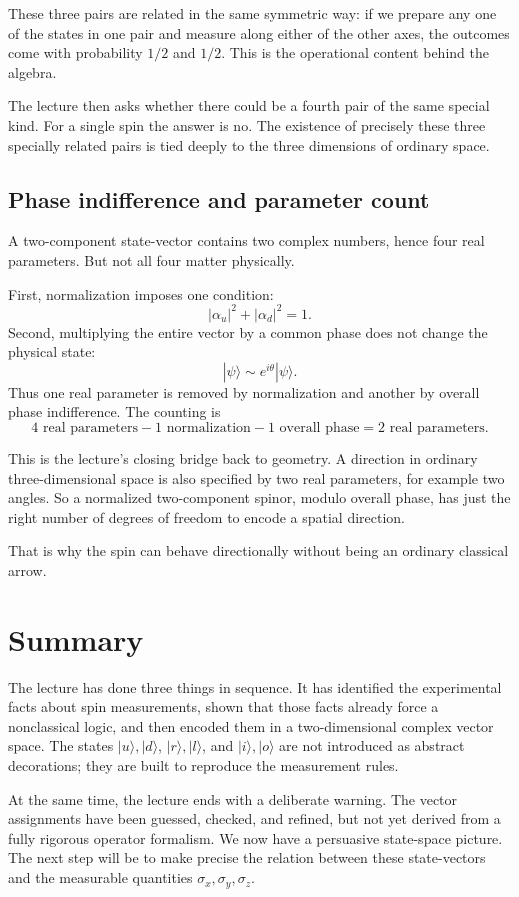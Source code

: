 These three pairs are related in the same symmetric way: if we prepare any one of the states in one pair and measure along either of the other axes, the outcomes come with probability \(1/2\) and \(1/2\). This is the operational content behind the algebra.

The lecture then asks whether there could be a fourth pair of the same special kind. For a single spin the answer is no. The existence of precisely these three specially related pairs is tied deeply to the three dimensions of ordinary space.

\subsection{Phase indifference and parameter count}

A two-component state-vector contains two complex numbers, hence four real parameters. But not all four matter physically.

First, normalization imposes one condition:
\begin{equation}
|\alpha_u|^2+|\alpha_d|^2=1.
\end{equation}
Second, multiplying the entire vector by a common phase does not change the physical state:
\begin{equation}
|\psi\rangle \sim e^{i\theta}|\psi\rangle.
\end{equation}
Thus one real parameter is removed by normalization and another by overall phase indifference. The counting is
\begin{equation}
4\text{ real parameters}-1\text{ normalization}-1\text{ overall phase}=2\text{ real parameters}.
\end{equation}

This is the lecture's closing bridge back to geometry. A direction in ordinary three-dimensional space is also specified by two real parameters, for example two angles. So a normalized two-component spinor, modulo overall phase, has just the right number of degrees of freedom to encode a spatial direction.

That is why the spin can behave directionally without being an ordinary classical arrow.

\section{Summary}

The lecture has done three things in sequence. It has identified the experimental facts about spin measurements, shown that those facts already force a nonclassical logic, and then encoded them in a two-dimensional complex vector space. The states \(|u\rangle,|d\rangle\), \(|r\rangle,|l\rangle\), and \(|i\rangle,|o\rangle\) are not introduced as abstract decorations; they are built to reproduce the measurement rules.

At the same time, the lecture ends with a deliberate warning. The vector assignments have been guessed, checked, and refined, but not yet derived from a fully rigorous operator formalism. We now have a persuasive state-space picture. The next step will be to make precise the relation between these state-vectors and the measurable quantities \(\sigma_x,\sigma_y,\sigma_z\).